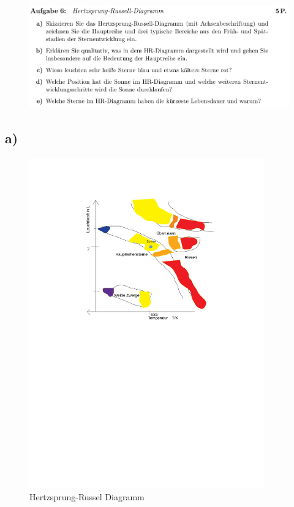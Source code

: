\begin{figure}[H]
    \centering
    \includegraphics[width=\textwidth]{images/Aufgabe6.jpg}
    \label{fig:3}
\end{figure}

\subsection{a)}

\begin{figure}[H]
    \centering
    \caption{Hertzsprung-Russel Diagramm}
    \includegraphics[width=0.9\textwidth]{images/hertz_russel.pdf}
\end{figure}

